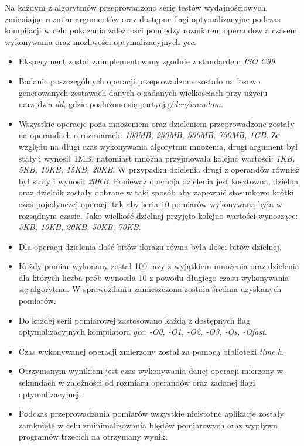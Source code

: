 \documentclass{article}
\begin{document}
Na każdym z algorytmów przeprowadzono serię testów wydajnościowych, zmieniając rozmiar argumentów oraz dostępne flagi optymalizacyjne podczas kompilacji w celu pokazania zależności pomiędzy rozmiarem operandów a czasem wykonywania oraz możliwości optymalizacyjnych \textit{gcc}.

\begin{itemize}
    \item Eksperyment został zaimplementowany zgodnie z standardem \textit{ISO C99}.
    \item Badanie poszczególnych operacji przeprowadzone zostało na losowo generowanych zestawach danych o zadanych wielkościach przy użyciu narzędzia \textit{dd}, gdzie posłużono się partycją\linebreak\textit{/dev/urandom}.
    \item Wszystkie operacje poza mnożeniem oraz dzieleniem przeprowadzone zostały na operandach o rozmiarach: \textit{100MB, 250MB, 500MB, 750MB, 1GB}. Ze względu na długi czas wykonywania algorytmu mnożenia, drugi argument był stały i wynosił 1MB, natomiast mnożna przyjmowała kolejno wartości: \textit{1KB, 5KB, 10KB, 15KB, 20KB}. W przypadku dzielenia drugi z operandów również był stały i wynosił \textit{20KB}. Ponieważ operacja dzielenia jest kosztowna, dzielna oraz dzielnik zostały dobrane w taki sposób aby zapewnić stosunkowo krótki czas pojedynczej operacji tak aby seria $10$ pomiarów wykonywana była w rozsądnym czasie. Jako wielkość dzielnej przyjęto kolejno wartości wynoszące: \textit{5KB, 10KB, 20KB, 50KB, 70KB}.
    \item Dla operacji dzielenia ilość bitów ilorazu równa była ilości bitów dzielnej.
    \item Każdy pomiar wykonany został 100 razy z wyjątkiem mnożenia oraz dzielenia dla których liczba prób wynosiła 10 z powodu długiego czasu wykonywania się algorytmu. W sprawozdaniu zamieszczona została średnia uzyskanych pomiarów.
    \item Do każdej serii pomiarowej zastosowano każdą z dostępnych flag optymalizacyjnych kompilatora \textit{gcc}: \textit{-O0, -O1, -O2, -O3, -Os, -Ofast}.
    \item Czas wykonywanej operacji zmierzony został za pomocą biblioteki \textit{time.h}.
    \item Otrzymanym wynikiem jest czas wykonywania danej operacji mierzony w sekundach w zależności od rozmiaru operandów oraz zadanej flagi optymalizacyjnej.
    \item Podczas przeprowadzania pomiarów wszystkie nieistotne aplikacje zostały zamknięte w celu zminimalizowania błędów pomiarowych oraz wypływu programów trzecich na otrzymany wynik.
\end{itemize}
\end{document}
